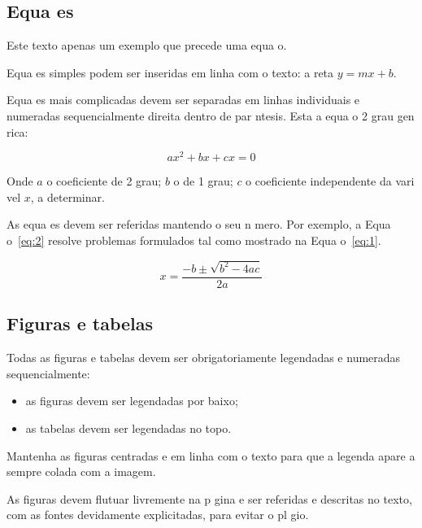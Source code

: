 \documentclass{article}
\begin{document}
\subsection*{Equa es}

\begin{info}
Este texto   apenas um exemplo que precede uma equa o.
\end{info}  

Equa es simples podem ser inseridas em linha com o texto: 
a reta   \(y=mx+b\).

Equa es mais complicadas devem ser separadas em linhas individuais e
numeradas sequencialmente   direita dentro de par ntesis.
Esta   a equa o 2  grau gen rica:

\begin{equation} \label{eq:1}
  ax^2+bx+cx=0
\end{equation}

Onde $a$   o coeficiente de 2  grau; $b$ o de 1  grau; $c$ o
coeficiente independente da vari vel $x$, a determinar.

As equa es devem ser referidas mantendo o seu n mero.
Por exemplo, a Equa o~\ref{eq:2} resolve problemas formulados tal como 
mostrado na Equa o~\ref{eq:1}.

\begin{equation} \label{eq:2}
  x=\frac{-b\pm \sqrt{b^2-4ac}}{2a}
\end{equation}

\subsection*{Figuras e tabelas}

Todas as figuras e tabelas devem ser obrigatoriamente legendadas e
numeradas sequencialmente:

\begin{itemize}
\item as figuras devem ser legendadas por baixo;
\item as tabelas devem ser legendadas no topo. 
\end{itemize}

Mantenha as figuras centradas e em linha com o texto para que a
legenda apare a sempre colada com a imagem.

\begin{info}
As figuras devem flutuar livremente na p gina e ser referidas e
descritas no texto, com as fontes devidamente explicitadas, para
evitar o pl gio.
\end{info}
\end{document}
